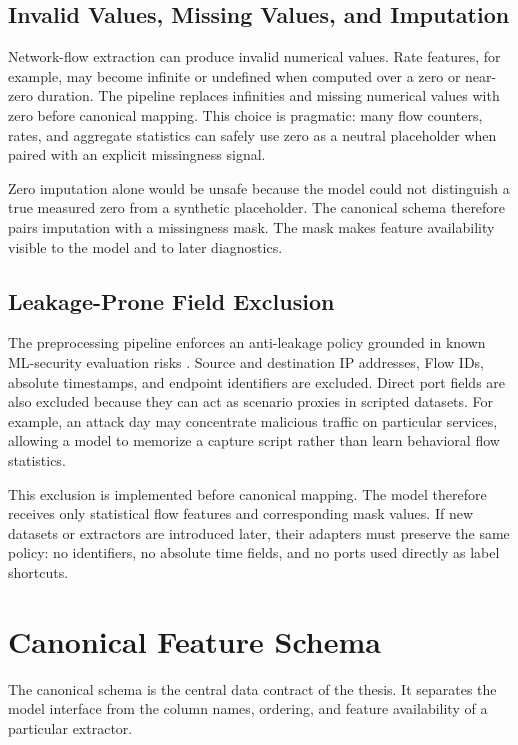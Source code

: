 \subsection{Invalid Values, Missing Values, and Imputation}
Network-flow extraction can produce invalid numerical values. Rate features, for example, may become infinite or undefined when computed over a zero or near-zero duration. The pipeline replaces infinities and missing numerical values with zero before canonical mapping. This choice is pragmatic: many flow counters, rates, and aggregate statistics can safely use zero as a neutral placeholder when paired with an explicit missingness signal.

Zero imputation alone would be unsafe because the model could not distinguish a true measured zero from a synthetic placeholder. The canonical schema therefore pairs imputation with a missingness mask. The mask makes feature availability visible to the model and to later diagnostics.

\subsection{Leakage-Prone Field Exclusion}
The preprocessing pipeline enforces an anti-leakage policy grounded in known ML-security evaluation risks \parencite{Arp2020DosDontsMLSecurity,Kaufman2011LeakageDataMining}. Source and destination IP addresses, Flow IDs, absolute timestamps, and endpoint identifiers are excluded. Direct port fields are also excluded because they can act as scenario proxies in scripted datasets. For example, an attack day may concentrate malicious traffic on particular services, allowing a model to memorize a capture script rather than learn behavioral flow statistics.

This exclusion is implemented before canonical mapping. The model therefore receives only statistical flow features and corresponding mask values. If new datasets or extractors are introduced later, their adapters must preserve the same policy: no identifiers, no absolute time fields, and no ports used directly as label shortcuts.

\section{Canonical Feature Schema}
The canonical schema is the central data contract of the thesis. It separates the model interface from the column names, ordering, and feature availability of a particular extractor.

